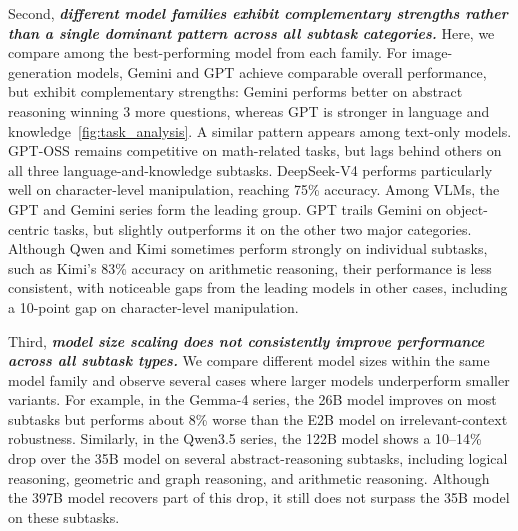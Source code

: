 Second, \textbf{\emph{different model families exhibit complementary strengths rather than a single dominant pattern across all subtask categories.}} Here, we compare among the best-performing model from each family. For image-generation models, Gemini  and GPT achieve comparable overall performance, but exhibit complementary strengths:  Gemini performs better on abstract reasoning winning 3 more questions, whereas GPT is stronger in language and knowledge~\autoref{fig:task_analysis}. A similar pattern appears among text-only models. GPT-OSS remains competitive on math-related tasks, but lags behind others on all three language-and-knowledge subtasks. DeepSeek-V4 performs particularly well on character-level manipulation, reaching 75\% accuracy. Among VLMs, the GPT and Gemini series form the leading group. GPT trails Gemini on  object-centric tasks, but slightly outperforms it on the other two major categories. Although Qwen and Kimi sometimes perform strongly on individual subtasks, such as Kimi's 83\% accuracy on arithmetic reasoning, their performance is less consistent, with noticeable gaps from the leading models in other cases, including a 10-point gap on character-level manipulation.

Third, \textbf{\emph{model size scaling does not consistently improve performance across all subtask types.}} We compare different model sizes within the same model family and observe  several cases where larger models underperform smaller variants. For example, in 
the Gemma-4 series, the 26B model improves on most subtasks but performs about 8\%  worse than the E2B model on irrelevant-context robustness. Similarly, in the Qwen3.5 series, the 122B model shows a 10--14\% drop over the 35B model on several 
abstract-reasoning subtasks, including logical reasoning, geometric and graph  reasoning, and arithmetic reasoning. Although the 397B model recovers part of this drop, it still does not surpass the 35B model on these subtasks.


